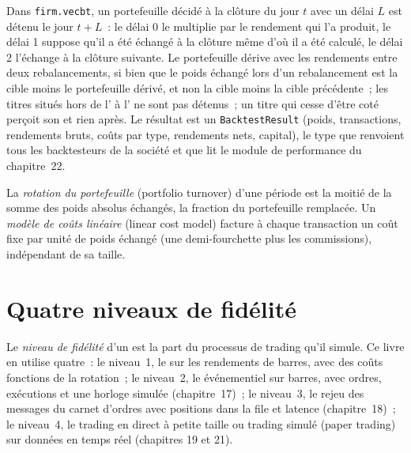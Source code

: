 Dans \texttt{firm.vecbt}, un portefeuille décidé à la clôture du jour $t$ avec un délai $L$ est détenu le jour $t + L$~: le délai 0 le multiplie par le rendement qui
l'a produit, le délai 1 suppose qu'il a été échangé à la clôture même d'où il a été calculé, le délai 2 l'échange à la clôture suivante. Le portefeuille dérive avec
les rendements entre deux rebalancements, si bien que le poids échangé lors d'un rebalancement est la cible moins le portefeuille dérivé, et non la cible moins la cible précédente~;
les titres situés hors de l' à l' ne sont pas détenus~; un titre qui cesse d'être coté perçoit son  et rien
après. Le résultat est un \texttt{BacktestResult} (poids, transactions, rendements bruts, coûts par type, rendements nets, capital), le type que renvoient tous les
backtesteurs de la société et que lit le module de performance du chapitre~22.

\begin{definition}\label{def:rs:vectorised-backtests:turnover}
La \emph{rotation du portefeuille} (portfolio turnover) d'une période est la moitié de la somme des poids absolus échangés, la fraction du portefeuille
remplacée. Un \emph{modèle de coûts linéaire} (linear cost model) facture à chaque transaction un coût fixe par unité de poids échangé (une demi-fourchette plus
les commissions), indépendant de sa taille.
\end{definition}

\section{Quatre niveaux de fidélité}

\begin{definition}\label{def:rs:vectorised-backtests:fidelity}
Le \emph{niveau de fidélité} d'un  est la part du processus de trading qu'il simule. Ce livre en utilise quatre~: le niveau~1,
le  sur les rendements de barres, avec des coûts fonctions de la rotation~; le niveau~2, le  événementiel sur barres, avec ordres, exécutions et
une horloge simulée (chapitre~17)~; le niveau~3, le rejeu des messages du carnet d'ordres avec positions dans la file et latence (chapitre~18)~; le niveau~4, le trading en direct
à petite taille ou trading simulé (paper trading) sur données en temps réel (chapitres 19 et 21).
\end{definition}

